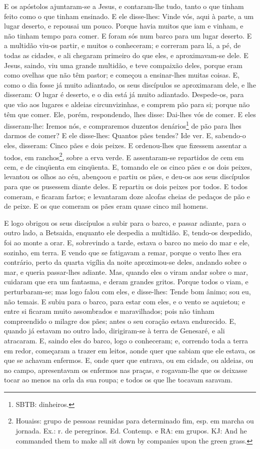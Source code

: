 E os apóstolos ajuntaram-se a Jesus, e contaram-lhe tudo, tanto o
que tinham feito como o que tinham ensinado. E ele
disse-lhes: Vinde vós, aqui à parte, a um lugar deserto, e repousai
um pouco. Porque havia muitos que iam e vinham, e não tinham tempo
para comer. E foram sós num barco para um lugar deserto.
E a multidão viu-os partir, e muitos o conheceram; e correram
para lá, a pé, de todas as cidades, e ali chegaram primeiro do que
eles, e aproximavam-se dele. E Jesus, saindo, viu uma grande
multidão, e teve compaixão deles, porque eram como ovelhas que não
têm pastor; e começou a ensinar-lhes muitas coisas. E, como o
dia fosse já muito adiantado, os seus discípulos se aproximaram
dele, e lhe disseram: O lugar é deserto, e o dia está já muito
adiantado. Despede-os, para que vão aos lugares e aldeias
circunvizinhas, e comprem pão para si; porque não têm que comer.
Ele, porém, respondendo, lhes disse: Dai-lhes vós de comer. E
eles disseram-lhe: Iremos nós, e compraremos duzentos
denários\footnote{SBTB: dinheiros.} de pão para lhes darmos de
comer? E ele disse-lhes: Quantos pães tendes? Ide ver. E,
sabendo-o eles, disseram: Cinco pães e dois peixes. E
ordenou-lhes que fizessem assentar a todos, em
ranchos\footnote{Houaiss: grupo de pessoas reunidas para determinado
fim, esp. em marcha ou jornada. Ex.: r. de peregrinos. Ed. Contemp.
e RA: em grupos. KJ: And he commanded them to make all sit down by
companies upon the green grass.}, sobre a erva verde. E
assentaram-se repartidos de cem em cem, e de cinqüenta em cinqüenta.
E, tomando ele os cinco pães e os dois peixes, levantou os
olhos ao céu, abençoou e partiu os pães, e deu-os aos seus
discípulos para que os pusessem diante deles. E repartiu os dois
peixes por todos. E todos comeram, e ficaram fartos; e
levantaram doze alcofas cheias de pedaços de pão e de peixe.
E os que comeram os pães eram quase cinco mil homens.

E logo obrigou os seus discípulos a subir para o barco, e passar
adiante, para o outro lado, a Betsaida, enquanto ele despedia a
multidão. E, tendo-os despedido, foi ao monte a orar.
E, sobrevindo a tarde, estava o barco no meio do mar e ele,
sozinho, em terra. E vendo que se fatigavam a remar, porque o
vento lhes era contrário, perto da quarta vigília da noite
aproximou-se deles, andando sobre o mar, e queria passar-lhes
adiante. Mas, quando eles o viram andar sobre o mar, cuidaram
que era um fantasma, e deram grandes gritos. Porque todos o
viam, e perturbaram-se; mas logo falou com eles, e disse-lhes: Tende
bom ânimo; sou eu, não temais. E subiu para o barco, para
estar com eles, e o vento se aquietou; e entre si ficaram muito
assombrados e maravilhados; pois não tinham compreendido o
milagre dos pães; antes o seu coração estava endurecido. E,
quando já estavam no outro lado, dirigiram-se à terra de Genesaré, e
ali atracaram. E, saindo eles do barco, logo o conheceram;
e, correndo toda a terra em redor, começaram a trazer em
leitos, aonde quer que sabiam que ele estava, os que se achavam
enfermos. E, onde quer que entrava, ou em cidade, ou aldeias,
ou no campo, apresentavam os enfermos nas praças, e rogavam-lhe que
os deixasse tocar ao menos na orla da sua roupa; e todos os que lhe
tocavam saravam.

